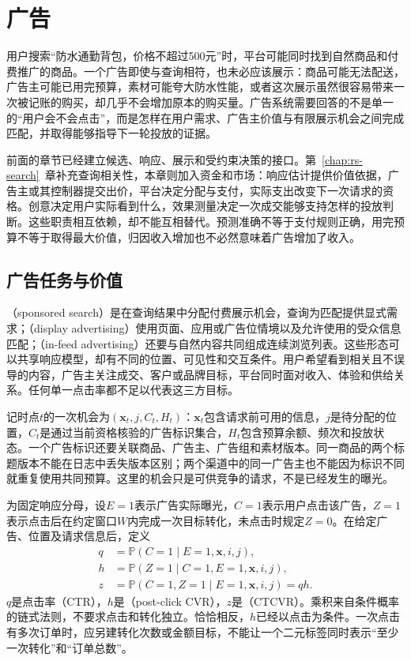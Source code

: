 \chapter{广告}
\label{chap:rs-advertising}

用户搜索“防水通勤背包，价格不超过500元”时，平台可能同时找到自然商品和付费推广的商品。一个广告即使与查询相符，也未必应该展示：商品可能无法配送，广告主可能已用完预算，素材可能夸大防水性能，或者这次展示虽然很容易带来一次被记账的购买，却几乎不会增加原本的购买量。广告系统需要回答的不是单一的“用户会不会点击”，而是怎样在用户需求、广告主价值与有限展示机会之间完成匹配，并取得能够指导下一轮投放的证据。

前面的章节已经建立候选、响应、展示和受约束决策的接口。第~\ref{chap:rs-search}~章补充查询相关性，本章则加入资金和市场：响应估计提供价值依据，广告主或其控制器提交出价，平台决定分配与支付，实际支出改变下一次请求的资格。创意决定用户实际看到什么，效果测量决定一次成交能够支持怎样的投放判断。这些职责相互依赖，却不能互相替代。预测准确不等于支付规则正确，用完预算不等于取得最大价值，归因收入增加也不必然意味着广告增加了收入。

\section{广告任务与价值}
\label{sec:rs-advertising-task}

（sponsored search）是在查询结果中分配付费展示机会，查询为匹配提供显式需求；（display advertising）使用页面、应用或广告位情境以及允许使用的受众信息匹配；（in-feed advertising）还要与自然内容共同组成连续浏览列表。这些形态可以共享响应模型，却有不同的位置、可见性和交互条件。用户希望看到相关且不误导的内容，广告主关注成交、客户或品牌目标，平台同时面对收入、体验和供给关系。任何单一点击率都不足以代表这三方目标。

记时点$t$的一次机会为$(\bm{x}_t,j,C_t,H_t)$：$\bm{x}_t$包含请求前可用的信息，$j$是待分配的位置，$C_t$是通过当前资格核验的广告标识集合，$H_t$包含预算余额、频次和投放状态。一个广告标识还要关联商品、广告主、广告组和素材版本。同一商品的两个标题版本不能在日志中丢失版本区别；两个渠道中的同一广告主也不能因为标识不同就重复使用共同预算。这里的机会只是可供竞争的请求，不是已经发生的曝光。

为固定响应分母，设$E=1$表示广告实际曝光，$C=1$表示用户点击该广告，$Z=1$表示点击后在约定窗口$W$内完成一次目标转化，未点击时规定$Z=0$。在给定广告、位置及请求信息后，定义
\begin{equation}
  \begin{aligned}
    q&=\mathbb{P}(C=1\mid E=1,\bm{x},i,j),\\
    h&=\mathbb{P}(Z=1\mid C=1,E=1,\bm{x},i,j),\\
    z&=\mathbb{P}(C=1,Z=1\mid E=1,\bm{x},i,j)=qh.
  \end{aligned}
  \label{eq:rs-advertising-chain}
\end{equation}
$q$是点击率（CTR），$h$是（post-click CVR），$z$是（CTCVR）。乘积来自条件概率的链式法则，不要求点击和转化独立。恰恰相反，$h$已经以点击为条件。一次点击有多次订单时，应另建转化次数或金额目标，不能让一个二元标签同时表示“至少一次转化”和“订单总数”。


